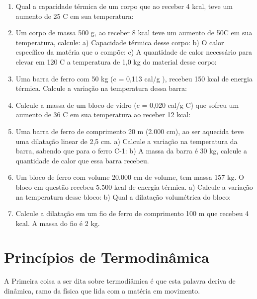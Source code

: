 \documentclass[12pt,a4paper]{book}
\begin{document}
\begin{enumerate}
\item Qual a capacidade térmica de um corpo que ao receber 4 kcal, teve um aumento de 25 C em sua temperatura:
\item  Um corpo de massa 500 g, ao receber 8 kcal teve um aumento de 50C em sua temperatura, calcule:
\newline a)	Capacidade térmica desse corpo:
\newline b) O calor específico da matéria que o compõe:
\newline c) A quantidade de calor necessário para elevar em 120 C a temperatura de 1,0 kg do material desse corpo:
\item Uma barra de ferro com 50 kg (c = 0,113 cal/g ), recebeu 150 kcal de energia térmica. Calcule a variação na temperatura dessa barra:
\item Calcule a massa de um bloco de vidro (c = 0,020 cal/g C) que sofreu um aumento de 36 C em sua temperatura ao receber 12 kcal:
\item  Uma barra de ferro de comprimento 20 m (2.000 cm), ao ser aquecida teve uma dilatação linear de 2,5 cm.
\newline a)	Calcule a variação na temperatura da barra, sabendo que para o ferro C-1:
\newline b)	A massa da barra é 30 kg, calcule a quantidade de calor que essa barra recebeu.
\item  Um bloco de ferro com volume 20.000 cm de volume, tem massa 157 kg. O bloco em questão recebeu 5.500 kcal de energia térmica.
\newline a)	Calcule a variação na temperatura desse bloco:
\newline b)	Qual a dilatação volumétrica do bloco:
\item  Calcule a dilatação em um fio de ferro de comprimento 100 m que recebeu 4 kcal. A massa do fio é 2 kg. 
\end{enumerate}

\chapter{Princípios de Termodinâmica}

A Primeira coisa a ser dita sobre termodiâmica é que esta palavra deriva de dinâmica, ramo da física que lida com a matéria em movimento.
\end{document}
